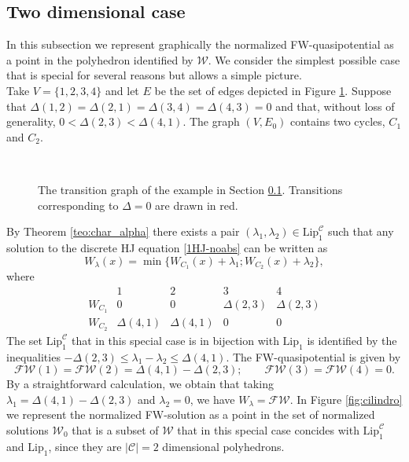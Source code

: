 \documentclass[reqno]{amsart}
\theoremstyle{plain}
\theoremstyle{definition}
\theoremstyle{remark}
\numberwithin{equation}{section}
\numberwithin{theorem}{section}
\newcommand{\<}{\langle}
\renewcommand{\>}{\rangle}
\begin{document}
\subsection{Two dimensional case}\label{exse}
In this subsection we represent graphically the normalized FW-quasipotential as a point in the polyhedron identified by $\mathcal{W}$. We consider the simplest possible case that is special for several reasons but allows a simple picture.\\

Take $V=\{1,2,3,4\}$ and let $E$ be the set of edges depicted in Figure  \ref{fig:2dim}. Suppose that $\Delta(1,2)=\Delta(2,1)=\Delta(3,4)=\Delta(4,3)=0$ and that, without loss of generality,  $0<\Delta(2,3)<\Delta(4,1)$. The graph $(V,E_0)$ contains two cycles, $C_1$ and $C_2$. 
\begin{figure}[h]
	\label{fig:2dim}
	\centering
	\mbox{ 
	}\caption{The transition graph of the example in Section \ref{exse}. Transitions corresponding to $\Delta=0$ are drawn in red.}
	\end{figure}  By Theorem \ref{teo:char_alpha} there exists a pair $(\lambda_1,\lambda_2)\in \mathrm{Lip}_1^{\mathcal C}$ such that any solution to the discrete HJ equation \eqref{1HJ-noabs} can be written as
\begin{equation*}
	W_\lambda(x)=\min\{ W_{C_1}(x) + \lambda_1; W_{C_2}(x) + \lambda_2\},
\end{equation*}
where 
\begin{equation*}
	\begin{array}{r|cccc}
		& 1 & 2 & 3 & 4 \\
		\hline
		W_{C_1} &   0 &   0   &  \Delta(2,3) & \Delta(2,3) \\
		W_{C_2} & \Delta(4,1) & \Delta(4,1) &     0 &  0  
	\end{array}
\end{equation*}
The set $\mathrm{Lip}_1^{\mathcal C}$ that in this special case is in bijection with $\mathrm{Lip}_1$ is
identified by the inequalities $-\Delta(2,3)\leq \lambda_1-\lambda_2\leq \Delta(4,1)$.
The FW-quasipotential is given by
\begin{equation*}
	\mathscr{FW}(1)=\mathscr{FW}(2)= \Delta(4,1)-\Delta(2,3);\qquad \mathscr{FW}(3)=\mathscr{FW}(4)=0.
\end{equation*}
By a straightforward calculation, we obtain that taking $\lambda_1=\Delta(4,1)-\Delta(2,3)$ and $\lambda_2=0$, we have $W_\lambda=\mathscr{FW}$. In Figure \ref{fig:cilindro} we represent the normalized FW-solution as a point in the set of normalized solutions $\mathcal{W}_0$ that is a subset of $\mathcal W$ that in this special case concides with $\mathrm{Lip}_1^{\mathcal C}$ and $\mathrm{Lip}_1$, since they are $|\mathcal C|=2$ dimensional polyhedrons.  
\end{document}
